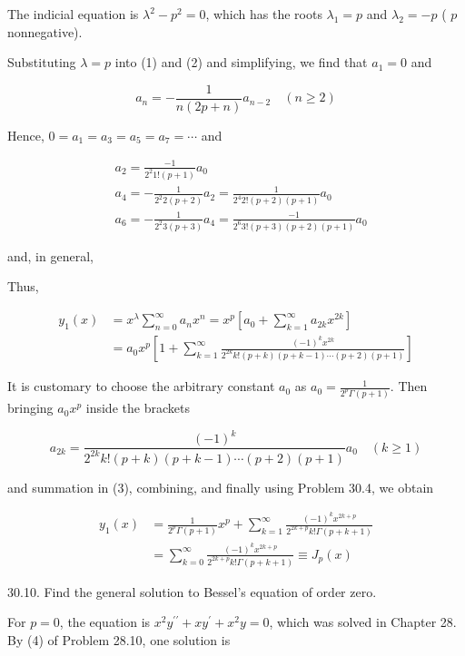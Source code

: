 \documentclass[10pt]{article}
\begin{document}
The indicial equation is $\lambda^{2}-p^{2}=0$, which has the roots $\lambda_{1}=p$ and $\lambda_{2}=-p$ ( $p$ nonnegative).

Substituting $\lambda=p$ into (1) and (2) and simplifying, we find that $a_{1}=0$ and

$$
a_{n}=-\frac{1}{n(2 p+n)} a_{n-2} \quad(n \geq 2)
$$

Hence, $0=a_{1}=a_{3}=a_{5}=a_{7}=\cdots$ and

$$
\begin{aligned}
& a_{2}=\frac{-1}{2^{2} 1 !(p+1)} a_{0} \\
& a_{4}=-\frac{1}{2^{2} 2(p+2)} a_{2}=\frac{1}{2^{4} 2 !(p+2)(p+1)} a_{0} \\
& a_{6}=-\frac{1}{2^{2} 3(p+3)} a_{4}=\frac{-1}{2^{6} 3 !(p+3)(p+2)(p+1)} a_{0}
\end{aligned}
$$

and, in general,

Thus,

\[ \begin{aligned} y_{1}(x) & =x^{\lambda} \sum_{n=0}^{\infty} a_{n} x^{n}=x^{p}\left[a_{0}+\sum_{k=1}^{\infty} a_{2 k} x^{2 k}\right] \\ & =a_{0} x^{p}\left[1+\sum_{k=1}^{\infty} \frac{(-1)^{k} x^{2 k}}{2^{2 k} k !(p+k)(p+k-1) \cdots(p+2)(p+1)}\right]\end{aligned} \]

It is customary to choose the arbitrary constant $a_{0}$ as $a_{0}=\frac{1}{2^{p} \Gamma(p+1)}$. Then bringing $a_{0} x^{p}$ inside the brackets

$$
a_{2 k}=\frac{(-1)^{k}}{2^{2 k} k !(p+k)(p+k-1) \cdots(p+2)(p+1)} a_{0} \quad(k \geq 1)
$$

and summation in (3), combining, and finally using Problem 30.4, we obtain

$$
\begin{aligned}
y_{1}(x) & =\frac{1}{2^{p} \Gamma(p+1)} x^{p}+\sum_{k=1}^{\infty} \frac{(-1)^{k} x^{2 k+p}}{2^{2 k+p} k ! \Gamma(p+k+1)} \\
& =\sum_{k=0}^{\infty} \frac{(-1)^{k} x^{2 k+p}}{2^{2 k+p} k ! \Gamma(p+k+1)} \equiv J_{p}(x)
\end{aligned}
$$

30.10. Find the general solution to Bessel's equation of order zero.

For $p=0$, the equation is $x^{2} y^{\prime \prime}+x y^{\prime}+x^{2} y=0$, which was solved in Chapter 28. By (4) of Problem 28.10, one solution is
\end{document}
